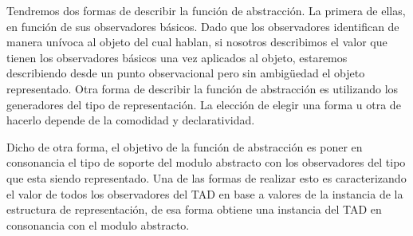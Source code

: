Tendremos dos formas de describir la funci\'on de abstracci\'on. La primera de ellas, en funci\'on de sus observadores b\'asicos. Dado que los observadores identifican de manera un\'ivoca al objeto del cual hablan, si nosotros describimos el valor que tienen los observadores b\'asicos una vez aplicados al objeto, estaremos describiendo desde un punto observacional pero sin ambig\"uedad el objeto representado. Otra forma de describir la funci\'on de abstracci\'on es utilizando los generadores del tipo de representaci\'on. La elecci\'on de elegir una forma u otra de hacerlo depende de la comodidad y declaratividad.

Dicho de otra forma, el objetivo de la funci\'on de abstracci\'on es poner en consonancia el tipo de soporte del modulo abstracto con los observadores del tipo que esta siendo representado. Una de las formas de realizar esto es caracterizando el valor de todos los observadores del TAD en base a valores de la instancia de la estructura de representaci\'on, de esa forma obtiene una instancia del TAD en consonancia con el modulo abstracto.
